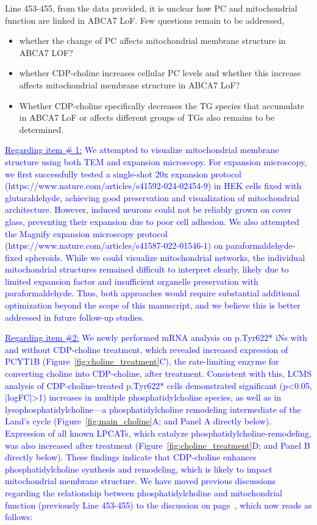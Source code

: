Line 453-455, from the data provided, it is unclear how PC and mitochondrial function are linked in ABCA7 LoF. Few questions remain to be addressed,
\begin{itemize}
	\item whether the change of PC affects mitochondrial membrane structure in ABCA7 LOF?

	\item whether CDP-choline increases cellular PC levels and whether this increase affects mitochondrial membrane structure in ABCA7 LoF?
	
	\item Whether CDP-choline specifically decreases the TG species that accumulate in ABCA7 LoF or affects different groups of TGs also remains to be determined.
\end{itemize}

\textcolor{blue}{\underline{Regarding item \# 1:} We attempted to visualize mitochondrial membrane structure using both TEM and expansion microscopy. For expansion microscopy, we first successfully tested a single-shot 20x expansion protocol (https://www.nature.com/articles/s41592-024-02454-9) in HEK cells fixed with glutaraldehyde, achieving good preservation and visualization of mitochondrial architecture. However, induced neurons could not be reliably grown on cover glass, preventing their expansion due to poor cell adhesion. We also attempted the Magnify expansion microscopy protocol (https://www.nature.com/articles/s41587-022-01546-1) on paraformaldehyde-fixed spheroids. While we could visualize mitochondrial networks, the individual mitochondrial structures remained difficult to interpret clearly, likely due to limited expansion factor and insufficient organelle preservation with paraformaldehyde. Thus, both approaches would require substantial additional optimization beyond the scope of this manuscript, and we believe this is better addressed in future follow-up studies.}

\textcolor{blue}{\underline{Regarding item \#2:} We newly performed mRNA analysis on p.Tyr622* iNs with and without CDP-choline treatment, which revealed increased expression of PCYT1B (Figure~\ref{fig:choline_treatment}C), the rate-limiting enzyme for converting choline into CDP-choline\cite{Lykidis1998-rj}, after treatment. Consistent with this, LCMS analysis of CDP-choline-treated p.Tyr622* cells demonstrated significant (p<0.05, |logFC|>1) increases in multiple phosphatidylcholine species, as well as in lysophosphatidylcholine—a phosphatidylcholine remodeling intermediate of the Land’s cycle (Figure~\ref{fig:main_choline}A; and Panel A directly below). Expression of all known LPCATs, which catalyze phosphatidylcholine-remodeling, was also increased  after treatment (Figure~\ref{fig:choline_treatment}D; and Panel B directly below). These findings indicate that CDP-choline enhances phosphatidylcholine synthesis and remodeling, which is likely to impact mitochondrial membrane structure. We have moved previous discussions regarding the relationship between phosphatidylcholine and mitochondrial function (previously Line 453-455) to the discussion on page~\pageref{quoteI-label}, which now reads as follows:}

